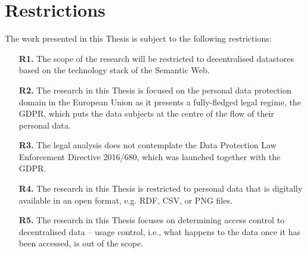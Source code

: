 \section{Restrictions}
\label{sec:restrictions}

The work presented in this Thesis is subject to the following restrictions:

\begin{enumerate}
    \item [\textbf{R1.}] The scope of the research will be restricted to decentralised datastores based on the technology stack of the Semantic Web.
    \item [\textbf{R2.}] The research in this Thesis is focused on the personal data protection domain in the European Union as it presents a fully-fledged legal regime, the GDPR, which puts the data subjects at the centre of the flow of their personal data.
    \item [\textbf{R3.}] The legal analysis does not contemplate the Data Protection Law Enforcement Directive 2016/680, which was launched together with the GDPR.
    \item [\textbf{R4.}] The research in this Thesis is restricted to personal data that is digitally available in an open format, e.g. RDF, CSV, or PNG files.
    \item [\textbf{R5.}] The research in this Thesis focuses on determining access control to decentralised data -- usage control, i.e., what happens to the data once it has been accessed, is out of the scope. %
\end{enumerate}